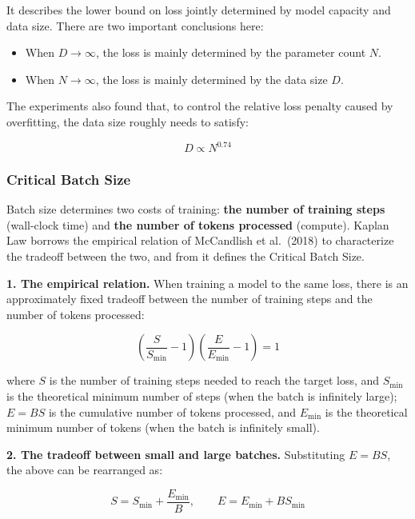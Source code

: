 \documentclass[
  english,
  11pt,
  a4paper,
]{article}
\providecommand{\tightlist}{%
  \setlength{\itemsep}{0pt}\setlength{\parskip}{0pt}}
\newenvironment{NotesFormula}{%
  \par\noindent\begin{minipage}{\linewidth}%
  \setlength{\parindent}{2em}%
  \setlength{\parskip}{0.35em}%
}{\end{minipage}\par}
\begin{document}
It describes the lower bound on loss jointly determined by model
capacity and data size. There are two important conclusions here:

\begin{itemize}
\tightlist
\item
  When \(D\to\infty\), the loss is mainly determined by the parameter
  count \(N\).
\item
  When \(N\to\infty\), the loss is mainly determined by the data size
  \(D\).
\end{itemize}

\begin{NotesFormula}

The experiments also found that, to control the relative loss penalty
caused by overfitting, the data size roughly needs to satisfy:

\[D\propto N^{0.74}\]

\end{NotesFormula}

\subsubsection{Critical Batch Size}\label{critical-batch-size}

Batch size determines two costs of training: \textbf{the number of
training steps} (wall-clock time) and \textbf{the number of tokens
processed} (compute). Kaplan Law borrows the empirical relation of
McCandlish et al.~(2018) to characterize the tradeoff between the two,
and from it defines the Critical Batch Size.

\begin{NotesFormula}

\textbf{1. The empirical relation.} When training a model to the same
loss, there is an approximately fixed tradeoff between the number of
training steps and the number of tokens processed:

\[\boxed{\left(\frac{S}{S_{\min}}-1\right)\left(\frac{E}{E_{\min}}-1\right)=1}\]

\end{NotesFormula}

where \(S\) is the number of training steps needed to reach the target
loss, and \(S_{\min}\) is the theoretical minimum number of steps (when
the batch is infinitely large); \(E=BS\) is the cumulative number of
tokens processed, and \(E_{\min}\) is the theoretical minimum number of
tokens (when the batch is infinitely small).

\begin{NotesFormula}

\textbf{2. The tradeoff between small and large batches.} Substituting
\(E=BS\), the above can be rearranged as:

\[\boxed{S=S_{\min}+\frac{E_{\min}}{B}},\qquad
\boxed{E=E_{\min}+BS_{\min}}\]

\end{NotesFormula}
\end{document}
